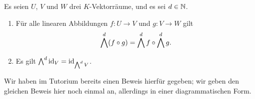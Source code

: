 \begin{proposition}
  \label{proposition: functoriality of exterior power}
  Es seien $U$, $V$ und $W$ drei $K$-Vektorräume, und es sei $d \in \mathbb{N}$.
  \begin{enumerate}
    \item
      Für alle linearen Abbildungen $f \colon U \to V$ und $g \colon V \to W$ gilt
      \[
          \bigwedge^{d} (f \circ g)
        = \bigwedge^{d} f \circ \bigwedge^{d} g.
      \]
    \item
      Es gilt $\bigwedge^{d}  \operatorname{id}_V = \operatorname{id}_{\bigwedge^{d} V}$.
  \end{enumerate}
\end{proposition}

Wir haben im Tutorium bereits einen Beweis hierfür gegeben;
wir geben den gleichen Beweis hier noch einmal an, allerdings in einer diagrammatischen Form.

